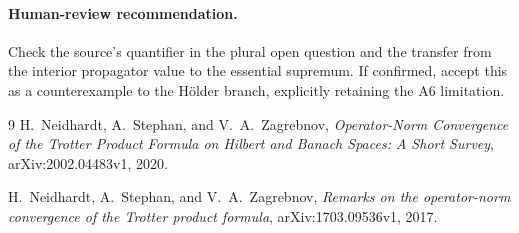 \documentclass[11pt]{article}
\begin{document}
\paragraph{Human-review recommendation.}
Check the source's quantifier in the plural open question and the transfer from
the interior propagator value to the essential supremum.  If confirmed, accept
this as a counterexample to the H\"older branch, explicitly retaining the A6
limitation.

\begin{thebibliography}{9}
H.~Neidhardt, A.~Stephan, and V.~A.~Zagrebnov,
\emph{Operator-Norm Convergence of the Trotter Product Formula on Hilbert and
Banach Spaces: A Short Survey}, arXiv:2002.04483v1, 2020.

H.~Neidhardt, A.~Stephan, and V.~A.~Zagrebnov,
\emph{Remarks on the operator-norm convergence of the Trotter product
formula}, arXiv:1703.09536v1, 2017.
\end{thebibliography}
\end{document}
